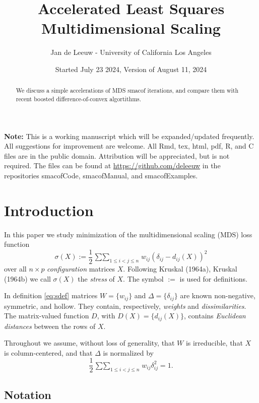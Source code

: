 \documentclass[
  12pt,
]{article}
\title{Accelerated Least Squares Multidimensional Scaling}
\author{Jan de Leeuw - University of California Los Angeles}
\date{Started July 23 2024, Version of August 11, 2024}
\begin{document}
\maketitle
\begin{abstract}
We discuss a simple accelerations of MDS smacof iterations, and compare them with recent boosted difference-of-convex algortithms.
\end{abstract}

{
\setcounter{tocdepth}{3}
\tableofcontents
}
\textbf{Note:} This is a working manuscript which will be expanded/updated
frequently. All suggestions for improvement are welcome. All Rmd, tex,
html, pdf, R, and C files are in the public domain. Attribution will be
appreciated, but is not required. The files can be found at
\url{https://github.com/deleeuw} in the repositories smacofCode, smacofManual,
and smacofExamples.

\section{Introduction}\label{introduction}

In this paper we study minimization of the multidimensional scaling (MDS) loss function
\begin{equation}
\sigma(X):=\frac12\mathop{\sum\sum}_{1\leq i<j\leq n} w_{ij}(\delta_{ij}-d_{ij}(X))^2
\label{eq:sdef}
\end{equation}
over all \(n\times p\) \emph{configuration} matrices \(X\). Following Kruskal (1964a), Kruskal (1964b) we call \(\sigma(X)\) the \emph{stress} of \(X\). The symbol \(:=\) is used for definitions.

In definition
\eqref{eq:sdef} matrices \(W=\{w_{ij}\}\) and \(\Delta=\{\delta_{ij}\}\) are known non-negative, symmetric, and hollow. They contain, respectively, \emph{weights} and \emph{dissimilarities}. The matrix-valued function \(D\), with \(D(X)=\{d_{ij}(X)\}\), contains \emph{Euclidean distances} between the rows of \(X\).

Throughout we assume, without loss of generality, that \(W\) is irreducible, that \(X\) is column-centered, and that \(\Delta\) is normalized by
\begin{equation}
\frac12\mathop{\sum\sum}_{1\leq i<j\leq n} w_{ij}\delta_{ij}^2=1.
\label{eq:delnorm}
\end{equation}

\subsection{Notation}\label{notation}
\end{document}
